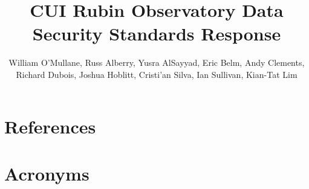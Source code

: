 \documentclass[DM,authoryear,toc]{lsstdoc}
\title{CUI Rubin Observatory Data Security Standards  Response}
\author{%
William O'Mullane,
Russ Alberry,
Yusra AlSayyad,
Eric Belm,
Andy Clements,
Richard Dubois,
Joshua Hoblitt,
Cristi'{a}n Silva,
Ian Sullivan,
Kian-Tat Lim
}
\date{\vcsDate}
\begin{document}
\maketitle



\appendix
\section{References} \label{sec:bib}
\renewcommand{\refname}{} %


\section{Acronyms} \label{sec:acronyms}

\end{document}
